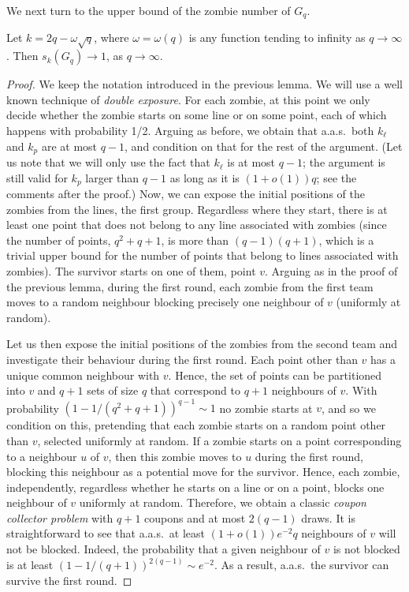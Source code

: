 \documentclass[12pt]{amsart}
\begin{document}
We next turn to the upper bound of the zombie number of $G_q$.

\begin{lemma}\label{lem2}
Let $k = 2q - \omega \sqrt{q}$, where $\omega = \omega(q)$ is any function tending to infinity as $q\to \infty$. Then $s_k(G_q) \to 1$, as $q \to \infty$.
\end{lemma}
\begin{proof}
We keep the notation introduced in the previous lemma. We will use a well known technique of \emph{double exposure}. For each zombie, at this point we only decide whether the zombie starts on some
line or on some point, each of which happens with probability 1/2. Arguing as before, we obtain that a.a.s.\ both $k_{\ell}$ and $k_p$ are at most $q-1$, and condition on that for the rest of the argument. (Let us note that we will only use the fact
that $k_\ell$ is at most $q-1$; the argument is still valid for $k_p$ larger than $q-1$ as long as it is $(1+o(1))q$; see the comments after the proof.) Now, we can expose the initial positions of the zombies
from the lines, the first group. Regardless where they start, there is at least one point that does not belong to any line associated with zombies (since the number of points, $q^2+q+1$, is more than
$(q-1)(q+1)$, which is a trivial upper bound for the number of points that belong to lines associated with zombies). The survivor starts on one of them, point $v$.
Arguing as in the proof of the previous lemma, during the first round, each zombie from the first team moves to a random neighbour blocking precisely one neighbour of $v$ (uniformly at random).

Let us then expose the initial positions of the zombies from the second team and investigate their behaviour during the first round. Each point other than $v$ has a unique common neighbour with $v$.
Hence, the set of points can be partitioned into $v$ and $q+1$ sets of size $q$ that correspond to $q+1$ neighbours of $v$. With probability $(1-1/(q^2+q+1))^{q-1} \sim 1$ no zombie starts at $v$, and
so we condition on this, pretending that each zombie starts on a random point other than $v$, selected uniformly at random. If a zombie starts on a point corresponding to a neighbour $u$ of $v$,
then this zombie moves to $u$ during the first round, blocking this neighbour as a potential move for the survivor. Hence, each zombie, independently, regardless whether he starts on a line or on a
point, blocks one neighbour of $v$ uniformly at random. Therefore, we obtain a classic \emph{coupon collector problem} with $q+1$ coupons and at most $2(q-1)$ draws. It is straightforward to see that a.a.s.\ at least $(1+o(1)) e^{-2} q$ neighbours of $v$ will not be blocked. Indeed, the probability that a given neighbour of $v$ is not blocked is at least $(1-1/(q+1))^{2(q-1)} \sim e^{-2}$. As a result, a.a.s.\ the survivor can survive the first round.


\end{proof}
\end{document}
